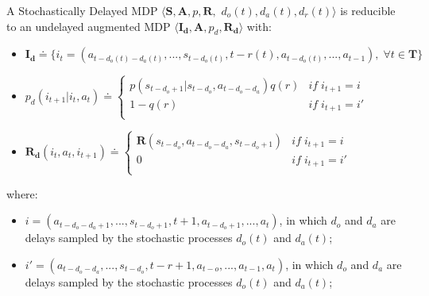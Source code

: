                \begin{theorem}
                    \label{th:sdmdpred}
                    A Stochastically Delayed MDP $\langle \mathbf{S}, \mathbf{A}, p, \mathbf{R},$ $ d_o(t), d_a(t), d_r(t) \rangle$ is reducible to an undelayed augmented MDP $\langle \mathbf{I_d}, \mathbf{A}, p_d, \mathbf{R_d} \rangle$ with: 
                    \begin{itemize}[topsep=0.5em, partopsep=0.5em]
                        \setlength\itemsep{0em}
                        \item $\mathbf{I_{d}} \doteq \Big\{ i_t = \left( a_{t-d_{o}(t)-d_{a}(t)}, ..., s_{t-d_{o}(t)}, t-r(t), a_{t-d_{o}(t)}, ..., a_{t-1} \right), \; \forall t \in \mathbf{T} \Big\}$
                        \item $p_d \left( i_{t+1} | i_t, a_t \right) \doteq  
                                    \begin{cases} 
                                        p \left( s_{t-d_o+1} | s_{t-d_o}, a_{t-d_o-d_a} \right) q\left(r\right) & if \; i_{t+1} = i \\
                                        1 - q\left(r\right) & if \; i_{t+1} = i'\\
                                    \end{cases}$
                        \item $\mathbf{R_d} \left( i_t, a_t, i_{t+1} \right) \doteq  
                                    \begin{cases} 
                                        \mathbf{R} \left( s_{t-d_o}, a_{t-d_o-d_a}, s_{t-d_o+1} \right) & if \; i_{t+1} = i \\
                                        0 & if \; i_{t+1} = i'\\ 
                                    \end{cases}$
                    \end{itemize}
                    where:
                    \begin{itemize}[topsep=0.5em, partopsep=0.5em]
                        \setlength\itemsep{0em}
                        \item $i = \left( a_{t-d_{o}-d_{a}+1}, ..., s_{t-d_o+1}, t+1, a_{t-d_o+1}, ..., a_{t}\right)$, in which $d_o$ and $d_a$ are delays sampled by the stochastic processes $d_o(t)$ and $d_a(t)$;
                        \item $i' = \left( a_{t-d_{o}-d_{a}}, ..., s_{t-d_o}, t-r+1, a_{t-o}, ..., a_{t-1}, a_{t} \right)$, in which $d_o$ and $d_a$ are delays sampled by the stochastic processes $d_o(t)$ and $d_a(t)$;
                    \end{itemize}
                \end{theorem}
        
